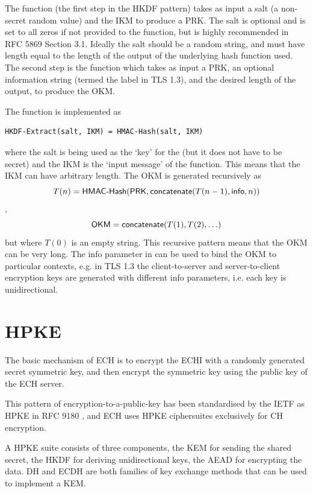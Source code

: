 The  function (the first step in the HKDF pattern) takes as input a salt (a non-secret random value) and the \ac{IKM} to produce a \ac{PRK}.
The salt is optional and is set to all zeros if not provided to the function, but is highly recommended in RFC 5869 Section 3.1.
Ideally the salt should be a random string,
and must have length equal to the length of the output of the underlying hash function used.
The second step is the  function
which takes as input a \ac{PRK},
an optional information string (termed the label in \ac{TLS} 1.3),
and the desired length of the output,
to produce the \ac{OKM}.

The  function is implemented as
\begin{verbatim}
HKDF-Extract(salt, IKM) = HMAC-Hash(salt, IKM)
\end{verbatim} where the salt is being used as the `key' for the  (but it does not have to be secret)
and the \ac{IKM} is the `input message' of the  function.
This means that the \ac{IKM} can have arbitrary length. The \ac{OKM} is generated recursively as \[T(n) = \text{\textsf{HMAC-Hash}}(\text{\textsf{PRK}}, \text{\textsf{concatenate}}(T(n-1), \text{\textsf{info}}, n))\], \[\text{\textsf{OKM}}=\text{\textsf{concatenate}}(T(1),T(2),\ldots)\]
but where $T(0)$ is an empty string.
This recursive pattern means that the \ac{OKM} can be very long.
The info parameter in  can be used to bind the \ac{OKM} to particular contexts, e.g. in \ac{TLS} 1.3 the client-to-server and server-to-client encryption keys are generated with different info parameters, i.e. each key is unidirectional. 

\section{HPKE}
The basic mechanism of \ac{ECH} is to encrypt the \ac{ECHI} with a randomly generated secret symmetric key, and then encrypt the symmetric key using the public key of the ECH server.

This pattern of encryption-to-a-public-key has been standardised by the \ac{IETF} as \ac{HPKE} in RFC 9180 \citep{rfc9180hpke},
and \ac{ECH} uses \ac{HPKE} ciphersuites exclusively
for \ac{CH} encryption.

A \ac{HPKE} suite consists of three components, the \ac{KEM} for sending the shared secret,
the \ac{HKDF} for deriving unidirectional keys,
the \ac{AEAD} for encrypting the data.
\ac{DH} and \ac{EC}\ac{DH} are both families of key exchange methods that can be used to implement a \ac{KEM}.

